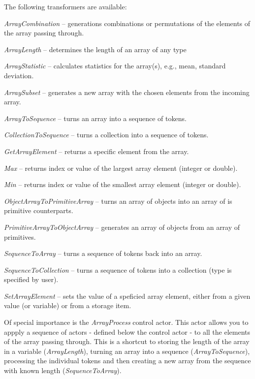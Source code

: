 \noindent The following transformers are available:
\begin{tight_itemize}
	\item \textit{ArrayCombination} -- generations combinations or permutations of
	the elements of the array passing through.
	\item \textit{ArrayLength} -- determines the length of an array of any type
	\item \textit{ArrayStatistic} -- calculates statistics for the array(s), e.g.,
	mean, standard deviation.
	\item \textit{ArraySubset} -- generates a new array with the chosen elements
	from the incoming array.
	\item \textit{ArrayToSequence} -- turns an array into a sequence of tokens.
	\item \textit{CollectionToSequence} -- turns a collection into a sequence of
	tokens.
	\item \textit{GetArrayElement} -- returns a specific element from the array.
	\item \textit{Max} -- returns index or value of the largest array element
	(integer or double).
	\item \textit{Min} -- returns index or value of the smallest array element
	(integer or double).
	\item \textit{ObjectArrayToPrimitiveArray} -- turns an array of objects
	into an array of is primitive counterparts.
	\item \textit{PrimitiveArrayToObjectArray} -- generates an array of objects
	from an array of primitives.
	\item \textit{SequenceToArray} -- turns a sequence of tokens back into an
	array.
	\item \textit{SequenceToCollection} -- turns a sequence of tokens into a
	collection (type is specified by user).
	\item \textit{SetArrayElement} -- sets the value of a speficied array 
	element, either from a given value (or variable) or from a storage item.
\end{tight_itemize}
Of special importance is the \textit{ArrayProcess} control actor. This actor
allows you to appply a sequence of actors - defined below the control actor - to
all the elements of the array passing through. This is a shortcut to storing the
length of the array in a variable (\textit{ArrayLength}), turning an array into
a sequence (\textit{ArrayToSequence}), processing the individual tokens and then
creating a new array from the sequence with known length
(\textit{SequenceToArray}).

